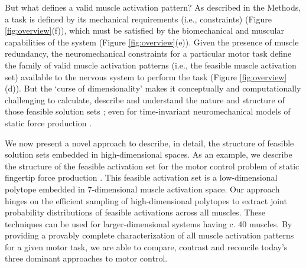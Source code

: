 \documentclass[10pt,letterpaper]{article}
\begin{document}
But what defines a valid muscle activation pattern? As described in the Methods, a task is defined by its mechanical requirements (i.e., constraints) (Figure \ref{fig:overview}(f)), which must be satisfied by the biomechanical and muscular capabilities of the system (Figure \ref{fig:overview}(e)). Given the presence of muscle redundancy, the neuromechanical constraints for a  particular motor task define the family of valid muscle activation patterns (i.e., the feasible muscle activation set) available to the nervous system to perform the task (Figure \ref{fig:overview}(d)).
But the `curse of dimensionality' \cite{bellman1957dynamic,bellman2015adaptive,avis1992Pivoting} makes it conceptually and computationally challenging to calculate, describe and understand the nature and structure of those feasible solution sets \cite{valero2009computational,Chao1978Graphical,spoor1983balancing,Kuo1993Human,theodorou2010optimalityEMBC,scholz1999uncontrolled,dingwell2010walkingvariability}; even for time-invariant neuromechanical models of static force production \cite{Valero-Cuevas2015high-dimensional,valero-cuevas2015fundamentals,sohn2013cat_bounding_box}.


We now present a novel approach to describe, in detail, the structure of feasible solution sets embedded in high-dimensional spaces. As an example, we describe the structure of  the feasible activation set for the motor control problem of static fingertip force production \cite{Valero-Cuevas1998Large,kutch2012challenges,Venkadesan2008Neural}. This feasible activation set is a low-dimensional polytope embedded in 7-dimensional muscle activation space. Our approach hinges on the efficient sampling of high-dimensional polytopes to extract joint probability distributions of feasible activations across all muscles. These techniques can be used for larger-dimensional systems having c. 40 muscles. By providing a provably complete characterization of all muscle activation patterns for a given motor task, we are able to compare, contrast and reconcile today's three dominant approaches to motor control.
\end{document}
